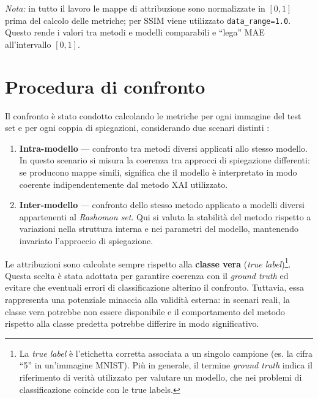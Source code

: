 \documentclass[12pt,a4paper,oneside]{report}
\numberwithin{figure}{chapter}
\numberwithin{table}{chapter}
\begin{document}
\noindent
\textit{Nota:} in tutto il lavoro le mappe di attribuzione sono normalizzate in $[0,1]$ prima del calcolo delle metriche; per SSIM viene utilizzato \texttt{data\_range=1.0}. Questo rende i valori tra metodi e modelli comparabili e “lega” MAE all’intervallo $[0,1]$.

\section{Procedura di confronto}
Il confronto è stato condotto calcolando le metriche per ogni immagine del test
set e per ogni coppia di spiegazioni, considerando due scenari distinti
\citep{bhatt2021evaluating, mueller2023rashomon, leventi2023consistency,
      krishna2022disagreement}:

\begin{enumerate}
      \item \textbf{Intra-modello} — confronto tra metodi diversi applicati allo stesso modello.
            In questo scenario si misura la coerenza tra approcci di spiegazione differenti:
            se producono mappe simili, significa che il modello è interpretato in modo coerente
            indipendentemente dal metodo XAI utilizzato.

      \item \textbf{Inter-modello} — confronto dello stesso metodo applicato a modelli diversi
            appartenenti al \emph{Rashomon set}.
            Qui si valuta la stabilità del metodo rispetto a variazioni nella struttura interna
            e nei parametri del modello, mantenendo invariato l’approccio di spiegazione.
\end{enumerate}

Le attribuzioni sono calcolate sempre rispetto alla \textbf{classe vera}
(\textit{true label})\footnote{La \emph{true label} è l’etichetta corretta
      associata a un singolo campione (es. la cifra “5” in un’immagine MNIST). Più in
      generale, il termine \emph{ground truth} indica il riferimento di verità
      utilizzato per valutare un modello, che nei problemi di classificazione
      coincide con le true labels.}. Questa scelta è stata adottata per garantire
coerenza con il \emph{ground truth} ed evitare che eventuali errori di
classificazione alterino il confronto. Tuttavia, essa rappresenta una
potenziale minaccia alla validità esterna: in scenari reali, la classe vera
potrebbe non essere disponibile e il comportamento del metodo rispetto alla
classe predetta potrebbe differire in modo significativo.
\end{document}

